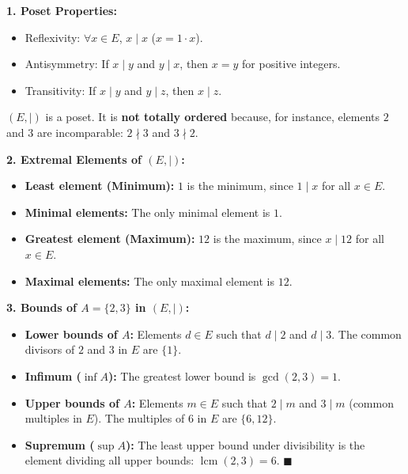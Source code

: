 \begin{solution}
\textbf{1. Poset Properties:}
\begin{itemize}[leftmargin=1.5em,itemsep=1pt]
  \item Reflexivity: $\forall x \in E$, $x \mid x$ ($x = 1 \cdot x$).
  \item Antisymmetry: If $x \mid y$ and $y \mid x$, then $x = y$ for positive integers.
  \item Transitivity: If $x \mid y$ and $y \mid z$, then $x \mid z$.
\end{itemize}
$(E, \mid)$ is a poset. It is \textbf{not totally ordered} because, for instance, elements $2$ and $3$ are incomparable: $2 \nmid 3$ and $3 \nmid 2$.

\textbf{2. Extremal Elements of $(E, \mid)$:}
\begin{itemize}[leftmargin=1.5em,itemsep=1pt]
  \item \textbf{Least element (Minimum):} $1$ is the minimum, since $1 \mid x$ for all $x \in E$.
  \item \textbf{Minimal elements:} The only minimal element is $1$.
  \item \textbf{Greatest element (Maximum):} $12$ is the maximum, since $x \mid 12$ for all $x \in E$.
  \item \textbf{Maximal elements:} The only maximal element is $12$.
\end{itemize}

\textbf{3. Bounds of $A = \{2, 3\}$ in $(E, \mid)$:}
\begin{itemize}[leftmargin=1.5em,itemsep=2pt]
  \item \textbf{Lower bounds of $A$:} Elements $d \in E$ such that $d \mid 2$ and $d \mid 3$. The common divisors of $2$ and $3$ in $E$ are $\{1\}$.
  \item \textbf{Infimum ($\inf A$):} The greatest lower bound is $\gcd(2, 3) = 1$.
  \item \textbf{Upper bounds of $A$:} Elements $m \in E$ such that $2 \mid m$ and $3 \mid m$ (common multiples in $E$). The multiples of 6 in $E$ are $\{6, 12\}$.
  \item \textbf{Supremum ($\sup A$):} The least upper bound under divisibility is the element dividing all upper bounds: $\operatorname{lcm}(2, 3) = 6$. \hfill $\blacksquare$
\end{itemize}
\end{solution}

